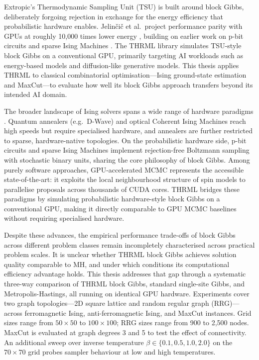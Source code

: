 \documentclass[conference]{IEEEtran}
\begin{document}
Extropic's Thermodynamic Sampling Unit (TSU) is built around block Gibbs, deliberately forgoing rejection in exchange for the energy efficiency that probabilistic hardware enables. Jelinčič et al.\ project performance parity with GPUs at roughly 10,000 times lower energy \cite{jelincic2025}, building on earlier work on p-bit circuits \cite{camsari2019} and sparse Ising Machines \cite{sim2021}. The THRML library \cite{thrml} simulates TSU-style block Gibbs on a conventional GPU, primarily targeting AI workloads such as energy-based models and diffusion-like generative models. This thesis applies THRML to classical combinatorial optimisation---Ising ground-state estimation and MaxCut---to evaluate how well its block Gibbs approach transfers beyond its intended AI domain.

The broader landscape of Ising solvers spans a wide range of hardware paradigms \cite{mcmahon2022}. Quantum annealers (e.g.\ D-Wave) and optical Coherent Ising Machines reach high speeds but require specialised hardware, and annealers are further restricted to sparse, hardware-native topologies. On the probabilistic hardware side, p-bit circuits \cite{camsari2019} and sparse Ising Machines \cite{sim2021} implement rejection-free Boltzmann sampling with stochastic binary units, sharing the core philosophy of block Gibbs. Among purely software approaches, GPU-accelerated MCMC \cite{weigel2011, weigel2012} represents the accessible state-of-the-art: it exploits the local neighbourhood structure of spin models to parallelise proposals across thousands of CUDA cores. THRML bridges these paradigms by simulating probabilistic hardware-style block Gibbs on a conventional GPU, making it directly comparable to GPU MCMC baselines without requiring specialised hardware.

Despite these advances, the empirical performance trade-offs of block Gibbs across different problem classes remain incompletely characterised across practical problem scales. It is unclear whether THRML block Gibbs achieves solution quality comparable to MH, and under which conditions its computational efficiency advantage holds. This thesis addresses that gap through a systematic three-way comparison of THRML block Gibbs, standard single-site Gibbs, and Metropolis-Hastings, all running on identical GPU hardware. Experiments cover two graph topologies---2D square lattice and random regular graph (RRG)---across ferromagnetic Ising, anti-ferromagnetic Ising, and MaxCut instances. Grid sizes range from $50{\times}50$ to $100{\times}100$; RRG sizes range from 900 to 2,500 nodes. MaxCut is evaluated at graph degrees 3 and 5 to test the effect of connectivity. An additional sweep over inverse temperature $\beta \in \{0.1, 0.5, 1.0, 2.0\}$ on the $70{\times}70$ grid probes sampler behaviour at low and high temperatures.
\end{document}
